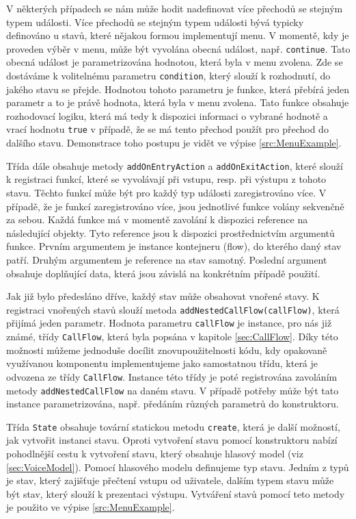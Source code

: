 \documentclass[ing,male,java,dept460]{diploma}						%
\begin{document}
V některých případech se nám může hodit nadefinovat více přechodů se stejným typem události. Více přechodů se stejným typem události bývá typicky definováno u stavů, které nějakou formou implementují menu. V momentě, kdy je proveden výběr v menu, může být vyvolána obecná událost, např. \texttt{continue}. Tato obecná událost je parametrizována hodnotou, která byla v menu zvolena. Zde se dostáváme k volitelnému parametru \texttt{condition}, který slouží k rozhodnutí, do jakého stavu se přejde. Hodnotou tohoto parametru je funkce, která přebírá jeden parametr a to je právě hodnota, která byla v menu zvolena. Tato funkce obsahuje rozhodovací logiku, která má tedy k dispozici informaci o vybrané hodnotě a vrací hodnotu \texttt{true} v případě, že se má tento přechod použít pro přechod do dalšího stavu. Demonstrace toho postupu je vidět ve výpise \ref{src:MenuExample}.

Třída dále obsahuje metody \texttt{addOnEntryAction} a \texttt{addOnExitAction}, které slouží k registraci funkcí, které se vyvolávají při vstupu, resp. při výstupu z tohoto stavu. Těchto funkcí může být pro každý typ události zaregistrováno více. V případě, že je funkcí zaregistrováno více, jsou jednotlivé funkce volány sekvenčně za sebou. Každá funkce má v momentě zavolání k dispozici reference na následující objekty. Tyto reference jsou k dispozici prostřednictvím argumentů funkce. Prvním argumentem je instance kontejneru (flow), do kterého daný stav patří. Druhým argumentem je reference na stav samotný. Poslední argument obsahuje doplňující data, která jsou závislá na konkrétním případě použití.

Jak již bylo předesláno dříve, každý stav může obsahovat vnořené stavy. K registraci vnořených stavů slouží metoda \texttt{addNestedCallFlow(callFlow)}, která přijímá jeden parametr. Hodnota parametru \texttt{callFlow} je instance, pro nás již známé, třídy \texttt{CallFlow}, která byla popsána v kapitole \ref{sec:CallFlow}. Díky této možnosti můžeme jednoduše docílit znovupoužitelnosti kódu, kdy opakovaně využívanou komponentu implementujeme jako samostatnou třídu, která je odvozena ze třídy \texttt{CallFlow}. Instance této třídy je poté registrována zavoláním metody \texttt{addNestedCallFlow} na daném stavu. V případě potřeby může být tato instance parametrizována, např. předáním různých parametrů do konstruktoru.

Třída \texttt{State} obsahuje tovární statickou metodu \texttt{create}, která je další možností, jak vytvořit instanci stavu. Oproti vytvoření stavu pomocí konstruktoru nabízí pohodlnější cestu k vytvoření stavu, který obsahuje hlasový model (viz \ref{sec:VoiceModel}). Pomocí hlasového modelu definujeme typ stavu. Jedním z typů je stav, který zajišťuje přečtení vstupu od uživatele, dalším typem stavu může být stav, který slouží k prezentaci výstupu. Vytváření stavů pomocí teto metody je použito ve výpise \ref{src:MenuExample}.
\end{document}
